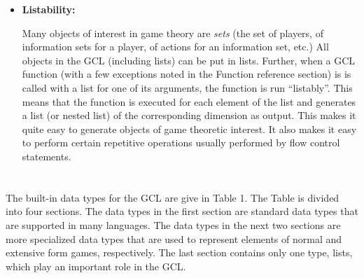 \begin{itemize}
\item {\bf Listability: } 

Many objects of interest in game theory are {\it sets} (the set of
players, of information sets for a player, of actions for an
information set, etc.)  All objects in the GCL (including lists) can
be put in lists.  Further, when a GCL function (with a few exceptions
noted in the Function reference section) is is called with a list for
one of its arguments, the function is run ``listably''.  This means
that the function is executed for each element of the list and
generates a list (or nested list) of the corresponding dimension as
output.  This makes it quite easy to generate objects of game
theoretic interest.  It also makes it easy to perform certain
repetitive operations usually performed by flow control statements.
\end{itemize}

\section{}

The built-in data types for the GCL are give in Table 1.  The Table is
divided into four sections. The data types in the first section are
standard data types that are supported in many languages.  The data
types in the next two sections are more specialized data types that
are used to represent elements of normal and extensive form games,
respectively.  The last section contains only one type, lists, which
play an important role in the GCL.

\medskip

